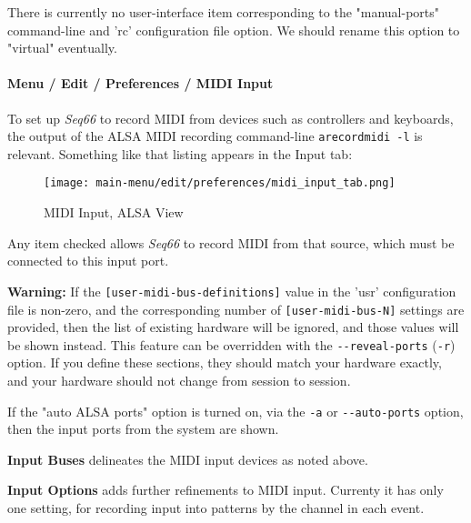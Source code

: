    There is currently no user-interface item corresponding to the "manual-ports"
   command-line and 'rc' configuration file option.
   We should rename this option to "virtual" eventually.

\paragraph{Menu / Edit / Preferences / MIDI Input}
\label{paragraph:menu_edit_preferences_midi_input}

   To set up \textsl{Seq66} to record MIDI from devices such as
   controllers and keyboards, the output of the ALSA MIDI recording
   command-line \texttt{arecordmidi -l} is relevant.
   Something like that listing appears in the Input tab:

\begin{figure}[H]
   \centering 
   \texttt{[image: main-menu/edit/preferences/midi\_input\_tab.png]}
   \caption{MIDI Input, ALSA View}
   \label{fig:midi_input_tab}
\end{figure}

   Any item checked allows \textsl{Seq66} to record MIDI from that source,
   which must be connected to this input port.

   \textbf{Warning:}
   If the 
   \texttt{[user-midi-bus-definitions]} value in the 'usr' configuration file
   is non-zero, and the
   corresponding number of
   \texttt{[user-midi-bus-N]} settings are provided, then
   the list of existing hardware will be ignored, and those values will be
   shown instead.
   This feature can be overridden with the
   \texttt{-{}-reveal-ports} (\texttt{-r}) option.
   If you define these sections, they should match your
   hardware exactly, and your hardware should not change from session to
   session.

   If the "auto ALSA ports" option is turned on, via the \texttt{-a} or
   \texttt{-{}-auto-ports} option, then
   the input ports from the system are shown.

   \setcounter{ItemCounter}{0}      %

   \textbf{Input Buses} delineates the MIDI input devices as noted above.

   \textbf{Input Options} adds further refinements to MIDI input.
   Currenty it has only one setting, for recording input into patterns by the
   channel in each event.

